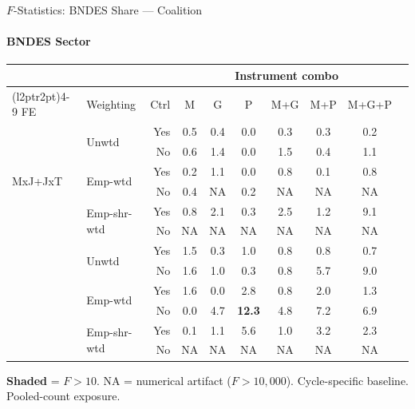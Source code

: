 \documentclass[aspectratio=169,10pt]{beamer}
\newcommand{\fpass}[1]{\cellcolor{pass}\textbf{#1}}
\begin{document}
\begin{frame}[t]{$F$-Statistics: BNDES Share --- Coalition}
\framesubtitle{BNDES Sector}
\begin{center}
\footnotesize
\setlength{\tabcolsep}{3.5pt}
\renewcommand{\arraystretch}{1.05}
\begin{tabular}{@{}llrccccccc@{}}
\toprule
 & & & \multicolumn{6}{c}{Instrument combo} \\
\cmidrule(l{2pt}r{2pt}){4-9}
FE & Weighting & Ctrl & M & G & P & M+G & M+P & M+G+P \\
\midrule
  \multirow{6}{*}{MxJ+JxT} & \multirow{2}{*}{Unwtd} & Yes & 0.5 & 0.4 & 0.0 & 0.3 & 0.3 & 0.2 \\
   &  & No & 0.6 & 1.4 & 0.0 & 1.5 & 0.4 & 1.1 \\
   & \multirow{2}{*}{Emp-wtd} & Yes & 0.2 & 1.1 & 0.0 & 0.8 & 0.1 & 0.8 \\
   &  & No & 0.4 & NA & 0.2 & NA & NA & NA \\
   & \multirow{2}{*}{Emp-shr-wtd} & Yes & 0.8 & 2.1 & 0.3 & 2.5 & 1.2 & 9.1 \\
   &  & No & NA & NA & NA & NA & NA & NA \\
\addlinespace[5pt]
  \multirow{6}{*}{MxJ+MxT} & \multirow{2}{*}{Unwtd} & Yes & 1.5 & 0.3 & 1.0 & 0.8 & 0.8 & 0.7 \\
   &  & No & 1.6 & 1.0 & 0.3 & 0.8 & 5.7 & 9.0 \\
   & \multirow{2}{*}{Emp-wtd} & Yes & 1.6 & 0.0 & 2.8 & 0.8 & 2.0 & 1.3 \\
   &  & No & 0.0 & 4.7 & \fpass{12.3} & 4.8 & 7.2 & 6.9 \\
   & \multirow{2}{*}{Emp-shr-wtd} & Yes & 0.1 & 1.1 & 5.6 & 1.0 & 3.2 & 2.3 \\
   &  & No & NA & NA & NA & NA & NA & NA \\
\bottomrule
\end{tabular}
\end{center}
{\scriptsize \colorbox{pass}{\textbf{Shaded}} = $F>10$. NA = numerical artifact ($F>10{,}000$). Cycle-specific baseline. Pooled-count exposure.}
\end{frame}
\end{document}
